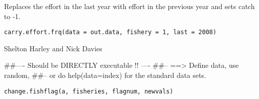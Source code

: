 \documentclass[a4paper]{book}
\begin{document}
%
\begin{Description}\relax

Replaces the effort in the last year with effort in the previous year and sets catch to -1. 
\end{Description}
%
\begin{Usage}
\begin{verbatim}
carry.effort.frq(data = out.data, fishery = 1, last = 2008)
\end{verbatim}
\end{Usage}
%
\begin{Arguments}
\begin{ldescription}
\item[\code{data}] 


\item[\code{fishery}] 


\item[\code{last}] 


\end{ldescription}
\end{Arguments}
%
\begin{Author}\relax

Shelton Harley and Nick Davies
\end{Author}
%
\begin{Examples}
\begin{ExampleCode}
##---- Should be DIRECTLY executable !! ----
##-- ==>  Define data, use random,
##--	or do  help(data=index)  for the standard data sets.

\end{ExampleCode}
\end{Examples}
%
\begin{Usage}
\begin{verbatim}
change.fishflag(a, fisheries, flagnum, newvals)
\end{verbatim}
\end{Usage}
%
\begin{Arguments}
\begin{ldescription}
\item[\code{a}] 


\item[\code{fisheries}] 


\item[\code{flagnum}] 


\item[\code{newvals}] 


\end{ldescription}
\end{Arguments}
\end{document}
